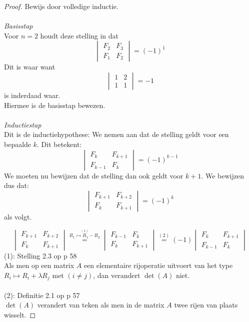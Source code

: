 \documentclass[lineaire_algebra_oplossingen.tex]{subfiles}
\begin{document}
\begin{proof}
Bewijs door volledige inductie.\\\\
\emph{Basisstap}\\
Voor $n=2$ houdt deze stelling in dat
\[
\begin{vmatrix}
F_{2}   & F_{3}\\
F_{1} & F_{2}
\end{vmatrix}
=
(-1)^{1}
\]
Dit is waar want
\[
\begin{vmatrix}
1 & 2\\
1 & 1
\end{vmatrix}
=
-1
\]
is inderdaad waar.\\
Hiermee is de basisstap bewezen.\\\\
\emph{Inductiestap}\\
Dit is de inductiehypothese: We nemen aan dat de stelling geldt voor een bepaalde $k$. Dit betekent:
\[
\begin{vmatrix}
F_{k}   & F_{k+1}\\
F_{k-1} & F_{k}
\end{vmatrix}
=
(-1)^{k-1}
\]
We moeten nu bewijzen dat de stelling dan ook geldt voor $k+1$.
We bewijzen dus dat:
\[
\begin{vmatrix}
F_{k+1}   & F_{k+2}\\
F_{k} & F_{k+1}
\end{vmatrix}
=
(-1)^{k}
\]
als volgt.

\[
\begin{vmatrix}
F_{k+1}   & F_{k+2}\\
F_{k} & F_{k+1}
\end{vmatrix}
\overset{\overset{(1)}{R_1 \longmapsto R_1-R_2}}{=}
\begin{vmatrix}
F_{k-1}   & F_{k}\\
F_{k} & F_{k+1}
\end{vmatrix}
\overset{(2)}{=}
(-1)
\begin{vmatrix}
F_{k} & F_{k+1}\\
F_{k-1}   & F_{k}
\end{vmatrix}
\]
(1): Stelling 2.3 op p 58\\
Als men op een matrix $A$ een elementaire rijoperatie uitvoert van het type $R_{i} \longmapsto R_{i}+\lambda R_{j}$ met $(i \neq j)$, dan verandert $\det(A)$ niet.\\\\
(2): Definitie 2.1 op p 57\\
$\det(A)$ verandert van teken als men in de matrix $A$ twee rijen van plaats wisselt.


\end{proof}
\end{document}
